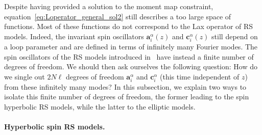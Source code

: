 Despite having provided a solution to the moment map constraint, equation~\eqref{eq:Loperator_general_sol2} still describes a too large space of functions. Most of these functions do not correspond to the Lax operator of RS models. Indeed, the invariant spin oscillators $\mathbf{a}_i^\alpha(z)$ and $\mathbf{c}_i^\alpha(z)$ still depend on a loop parameter and are defined in terms of infinitely many Fourier modes. The spin oscillators of the RS models introduced in~\cite{krichever_spin_1995} have instead a finite number of degrees of freedom.
We should then ask ourselves the following question: How do we single out $2N\ell$ degrees of freedom $\mathbf{a}_i^\alpha$ and $\mathbf{c}_i^\alpha$ (this time independent of $z$) from these infinitely many modes? In this subsection, we explain two ways to isolate this finite number of degrees of freedom, the former leading to the spin hyperbolic RS models, while the latter to the elliptic models.

\paragraph{Hyperbolic spin RS models.}

